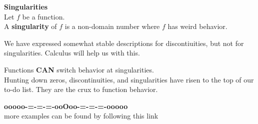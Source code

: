 \documentclass{ximera}
\begin{document}
\begin{template}  \textbf{\textcolor{blue!55!black}{Singularities}}  \\

Let $f$ be a function. \\

A \textbf{\textcolor{green!50!black}{singularity}} of $f$ is a non-domain number where $f$ has weird behavior.



\begin{explanation}

We have expressed somewhat stable descriptions for discontiuities, but not for singularities.  Calculus will help us with this.
\end{explanation}


\end{template}

Functions \textbf{\textcolor{red!80!black}{CAN}} switch behavior at singularities. \\




Hunting down zeros, discontinuities, and singularities have risen to the top of our to-do list.  They are the crux to function behavior. \\














\begin{center}
\textbf{\textcolor{green!50!black}{ooooo-=-=-=-ooOoo-=-=-=-ooooo}} \\

more examples can be found by following this link\\ 

\end{center}
\end{document}
